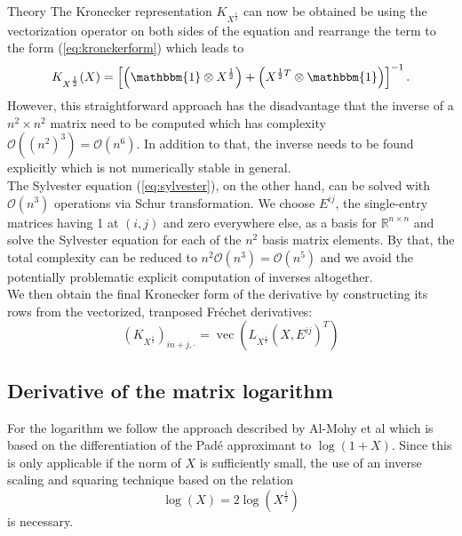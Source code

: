 \begin{chapter}{Theory}
The Kronecker representation $K_{X^{\frac{1}{2}}}$ can now be obtained be using the vectorization operator on both sides of the equation and rearrange the term
to the form (\ref{eq:kronckerform}) which leads to
\begin{equation}
    K_{X^{\frac{1}{2}}}(X)=\left[\left(\mathbbm{1}\otimes X^{\frac{1}{2}}\right)+\left(X^{\frac{1}{2}T}\otimes \mathbbm{1}\right) \right]^{-1}.
\end{equation}
However, this straightforward approach has the disadvantage that the inverse of a $n^2\times n^2$ matrix need to be computed which has complexity
$\mathcal{O}((n^2)^3)=\mathcal{O}(n^6)$. In addition to that, the inverse needs to be found explicitly which is not numerically stable in general.\\

The Sylvester equation (\ref{eq:sylvester}), on the other hand, can be solved with $\mathcal{O}(n^3)$ operations via Schur transformation. We choose $E^{ij}$, the single-entry
matrices having 1 at $(i,j)$ and zero everywhere else, as a basis for $\mathbb{R}^{n\times n}$ and solve the Sylvester equation for each of the $n^2$ 
basis matrix elements. By that, the total complexity can be reduced to $n^2\mathcal{O}(n^3)=\mathcal{O}(n^5)$ and we avoid the 
potentially problematic explicit computation of inverses altogether.\\

We then obtain the final Kronecker form of the derivative by constructing its rows from the vectorized, tranposed Fr\'{e}chet derivatives:
\begin{equation}
    \left(K_{X^{\frac{1}{2}}}\right)_{in + j,\cdot} = \operatorname{vec}\left(L_{X^{\frac{1}{2}}}(X,E^{ij})^T\right) 
\end{equation}

\subsection{Derivative of the matrix logarithm} %
\label{sub:Derivative of the matrix logarithm}
For the logarithm we follow the approach described by Al-Mohy et al \cite{AlmohyFrechet} which is based on the differentiation of the Pad\'{e} approximant to $\log(1+X)$.
Since this is only applicable if the norm of $X$ is sufficiently small, the  use of an inverse scaling and squaring technique based on the relation
\begin{equation}
    \log(X) = 2\log(X^{\frac{1}{2}})
\end{equation}
is necessary.\\


\end{chapter}
